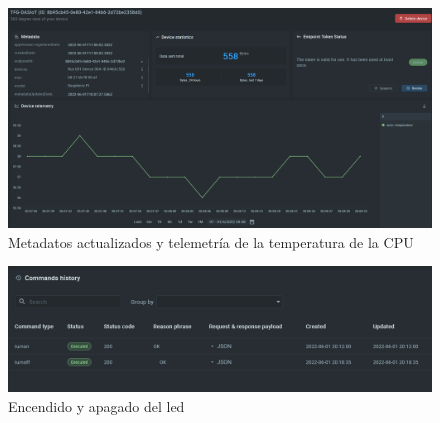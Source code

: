 {\begin{figure}[p]
    \centering
    \includegraphics[width=\linewidth]{imagenes/data-execution.png}
    \caption{Metadatos actualizados y telemetría de la temperatura de la CPU}
    \label{fig:figure13}
\end{figure}

\begin{figure}[p]
    \centering
    \includegraphics[width=\linewidth]{imagenes/command-execution.png}
    \caption{Encendido y apagado del led}
    \label{fig:figure14}
\end{figure}

}

